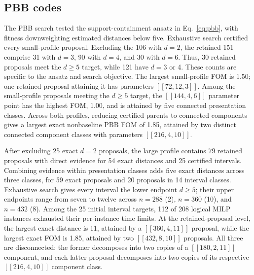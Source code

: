 \documentclass[aps,prx,twocolumn,superscriptaddress,nofootinbib,floatfix]{revtex4-2}
\newcommand{\code}[1]{\ensuremath{\left[\!\left[#1\right]\!\right]}}
\begin{document}
\subsection{PBB codes}
\label{sec:pbb-results}

The PBB search tested the support-containment ansatz in
Eq.~\eqref{eq:pbb}, with fitness downweighting estimated distances below five.
Exhaustive search certified every small-profile proposal.  Excluding the 106
with $d=2$, the retained 151
comprise 31 with $d=3$, 90 with $d=4$, and 30 with $d=6$.  Thus, 30 retained
proposals meet the $d\geq5$ target, while 121 have $d=3$ or 4.  These
counts are specific to the ansatz and search objective.  The largest
small-profile FOM is 1.50; one retained proposal attaining it has
parameters $\code{72,12,3}$.  Among the small-profile proposals meeting
the $d\geq5$ target, the $\code{144,4,6}$ parameter point has the highest FOM,
1.00, and is attained by five connected presentation classes.  Across both
profiles, reducing certified parents to connected components gives a largest
exact nonbaseline PBB FOM of 1.85, attained by two distinct connected
component classes with parameters $\code{216,4,10}$.

After excluding 25 exact $d=2$ proposals, the large profile contains 79
retained proposals with direct evidence for 54 exact distances and 25
certified intervals.  Combining evidence within presentation classes adds five
exact distances across three classes, for 59 exact proposals and 20
proposals in 14 interval classes.  Exhaustive search gives every interval
the lower endpoint $d\geq5$; their upper endpoints range from seven to twelve
across $n=288$ (2), $n=360$ (10), and $n=432$ (8).  Among the 25 initial
interval targets, 112 of 208 logical MILP instances exhausted their
per-instance time limits.
At the retained-proposal level, the largest exact distance is 11,
attained by a $\code{360,4,11}$ proposal, while the largest exact FOM is
1.85, attained by two $\code{432,8,10}$ proposals.  All three are
disconnected: the former decomposes into two copies of a $\code{180,2,11}$
component, and each latter proposal decomposes into two copies of its
respective $\code{216,4,10}$ component class.
\end{document}
